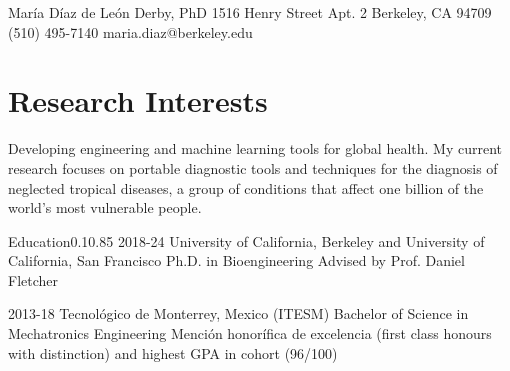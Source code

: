 \documentclass{federico_cv}
\begin{document}
\contact
{María Díaz de León Derby, PhD}
{1516 Henry Street Apt. 2}
{Berkeley, CA 94709}
{(510) 495-7140} %
{maria.diaz@berkeley.edu} %

\section{Research Interests}
Developing engineering and machine learning tools for global health. My current research focuses on portable diagnostic tools and techniques for the diagnosis of neglected tropical diseases, a group of conditions that affect one billion of the world's most vulnerable people. %


\begin{tblSection}{Education}{0.1}{0.85}
\degree
{2018-24}
{University of California, Berkeley and University of California, San Francisco}
{Ph.D. in Bioengineering}
{Advised by Prof. Daniel Fletcher}

\degree
{2013-18}
{Tecnológico de Monterrey, Mexico (ITESM)}
{Bachelor of Science in Mechatronics Engineering}
{Mención honorífica de excelencia (first class honours with distinction) and highest GPA in cohort (96/100)}




\end{tblSection}
\end{document}
